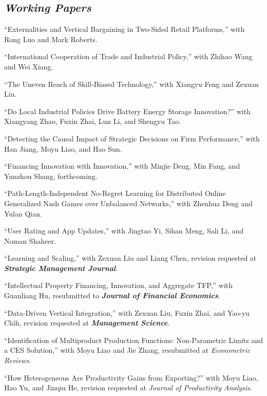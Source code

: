 \documentclass[letterpaper]{article}
\begin{document}
\subsection*{\textit{Working Papers}}
\begin{papers}
\item ``Externalities and Vertical Bargaining in Two-Sided Retail Platforms,'' with Rong Luo and Mark Roberts.

\item ``International Cooperation of Trade and Industrial Policy,'' with Zhihao Wang and Wei Xiang.

\item ``The Uneven Reach of Skill-Biased Technology,'' with Xiangyu Feng and Zexuan Liu.

\item ``Do Local Industrial Policies Drive Battery Energy Storage Innovation?'' with Xiangyang Zhao, Fuxin Zhai, Lun Li, and Shengyu Tao.

\item ``Detecting the Causal Impact of Strategic Decisions on Firm Performance,'' with Han Jiang, Moyu Liao, and Hao Sun.

\item ``Financing Innovation with Innovation,'' with Minjie Deng, Min Fang, and Yunzhou Shang, forthcoming.

\item ``Path-Length-Independent No-Regret Learning for Distributed Online Generalized Nash Games over Unbalanced Networks,'' with Zhenhua Deng and Yulan Qian.

\item ``User Rating and App Updates,'' with Jingtao Yi, Sihan Meng, Sali Li, and Noman Shaheer.

\item ``Learning and Scaling,'' with Zexuan Liu and Liang Chen, revision requested at \textbf{\textit{Strategic Management Journal}}.

\item ``Intellectual Property Financing, Innovation, and Aggregate TFP,'' with Guanliang Hu, resubmitted to \textbf{\textit{Journal of Financial Economics}}.

\item ``Data-Driven Vertical Integration,'' with Zexuan Liu, Fuxin Zhai, and Yao-yu Chih, revision requested at \textbf{\textit{Management Science}}.

\item ``Identification of Multiproduct Production Functions: Non-Parametric Limits and a CES Solution,'' with Moyu Liao and Jie Zhang, resubmitted at \textit{Econometric Reviews}.

\item ``How Heterogeneous Are Productivity Gains from Exporting?'' with Moyu Liao, Hao Yu, and Jinqiu He, revision requested at \textit{Journal of Productivity Analysis}.
\end{papers}
\end{document}
